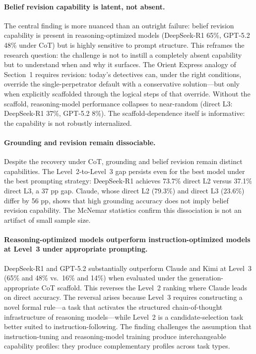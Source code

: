 \documentclass{article}
\theoremstyle{definition}
\begin{document}
\paragraph{Belief revision capability is latent, not absent.} The central finding is more nuanced than an outright failure: belief revision capability is present in reasoning-optimized models (DeepSeek-R1 65\%, GPT-5.2 48\% under CoT) but is highly sensitive to prompt structure. This reframes the research question: the challenge is not to instill a completely absent capability but to understand when and why it surfaces. The Orient Express analogy of Section~1 requires revision: today's detectives can, under the right conditions, override the single-perpetrator default with a conservative solution---but only when explicitly scaffolded through the logical steps of that override. Without the scaffold, reasoning-model performance collapses to near-random (direct L3: DeepSeek-R1 37\%, GPT-5.2 8\%). The scaffold-dependence itself is informative: the capability is not robustly internalized.

\paragraph{Grounding and revision remain dissociable.} Despite the recovery under CoT, grounding and belief revision remain distinct capabilities. The Level~2-to-Level~3 gap persists even for the best model under the best prompting strategy: DeepSeek-R1 achieves 73.7\% direct L2 versus 37.1\% direct L3, a 37 pp gap. Claude, whose direct L2 (79.3\%) and direct L3 (23.6\%) differ by 56 pp, shows that high grounding accuracy does not imply belief revision capability. The McNemar statistics confirm this dissociation is not an artifact of small sample size.

\paragraph{Reasoning-optimized models outperform instruction-optimized models at Level~3 under appropriate prompting.} DeepSeek-R1 and GPT-5.2 substantially outperform Claude and Kimi at Level~3 (65\% and 48\% vs.\ 16\% and 14\%) when evaluated under the generation-appropriate CoT scaffold. This reverses the Level~2 ranking where Claude leads on direct accuracy. The reversal arises because Level~3 requires constructing a novel formal rule---a task that activates the structured chain-of-thought infrastructure of reasoning models---while Level~2 is a candidate-selection task better suited to instruction-following. The finding challenges the assumption that instruction-tuning and reasoning-model training produce interchangeable capability profiles: they produce complementary profiles across task types.
\end{document}
